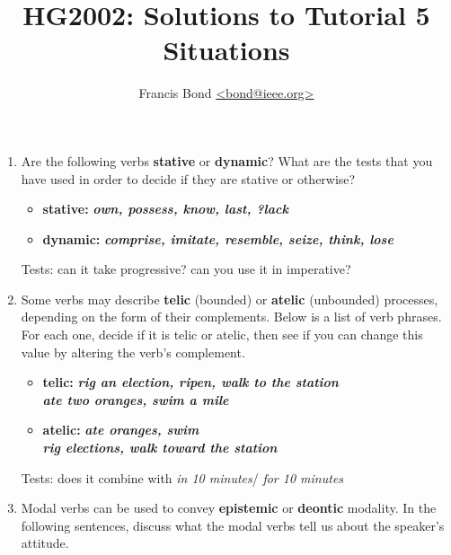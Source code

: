\documentclass[a4paper]{article}
\title{\vspace*{-30mm}HG2002: Solutions to Tutorial 5\\   Situations}
\author{Francis Bond \url{<bond@ieee.org>}}
\date{}%
\newcommand{\lex}[1]{\textbf{\textit{#1}}}
\newcommand{\eng}[1]{\textit{#1}}
\begin{document}
\maketitle

\begin{enumerate}


\item Are the following verbs \textbf{stative} or \textbf{dynamic}?
  What are the tests that you have used in order to decide if they are
  stative or otherwise?

  \begin{itemize}
  \item \textbf{stative:} \lex{own, possess, know, last, ?lack}
  \item \textbf{dynamic:} \lex{comprise, imitate, resemble, seize,
      think, lose}
  \end{itemize}
  Tests: can it take progressive? can you use it in imperative?


\item Some verbs may describe \textbf{telic} (bounded) or \textbf{atelic} (unbounded)
  processes, depending on the form of their complements.  Below is a
  list of verb phrases. For each one, decide if it is telic or atelic,
  then see if you can change this value by altering the verb’s
  complement.
  \begin{itemize}
  \item \textbf{telic:} \lex{rig an election, ripen, walk to the
      station}
    \\ \lex{ate two oranges, swim a mile}
  \item \textbf{atelic:} \lex{ate oranges, swim}
    \\   \lex{rig elections,  walk toward the  station}
  \end{itemize}
  Tests: does it combine with \eng{in 10 minutes}/ \eng{for 10 minutes}

\item Modal verbs can be used to convey \textbf{epistemic} or
  \textbf{deontic} modality. In the following sentences, discuss what
  the modal verbs tell us about the speaker’s attitude.


\end{enumerate}
\end{document}
